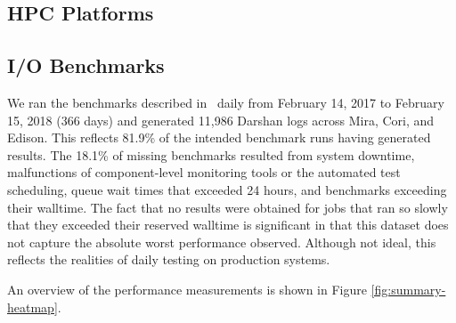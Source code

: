 
\subsection{HPC Platforms}


\subsection{I/O Benchmarks}

We ran the benchmarks described in~\cite{Lockwood2017} daily from February 14, 2017 to February 15, 2018 (366 days) and generated 11,986 Darshan logs across Mira, Cori, and Edison.  This reflects 81.9\% of the intended benchmark runs having generated results.
The 18.1\% of missing benchmarks resulted from system downtime, malfunctions of component-level monitoring tools or the automated test scheduling, queue wait times that exceeded 24 hours, and benchmarks exceeding their walltime.
The fact that no results were obtained for jobs that ran so slowly that they exceeded their reserved walltime is significant in that this dataset does not capture the absolute worst performance observed.
Although not ideal, this reflects the realities of daily testing on production systems.

An overview of the performance measurements is shown in Figure \ref{fig:summary-heatmap}.


